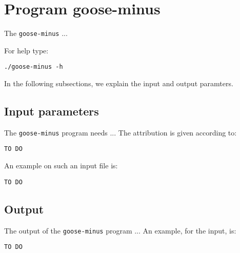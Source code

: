 \section{Program goose-minus}
The \texttt{goose-minus} ...

For help type:
\begin{lstlisting}
./goose-minus -h
\end{lstlisting}
In the following subsections, we explain the input and output paramters.

\subsection{Input parameters}

The \texttt{goose-minus} program needs ...
The attribution is given according to:
\begin{lstlisting}
TO DO
\end{lstlisting}

An example on such an input file is:
\begin{lstlisting}
TO DO
\end{lstlisting}

\subsection{Output}
The output of the \texttt{goose-minus} program ...
An example, for the input, is:
\begin{lstlisting}
TO DO
\end{lstlisting}